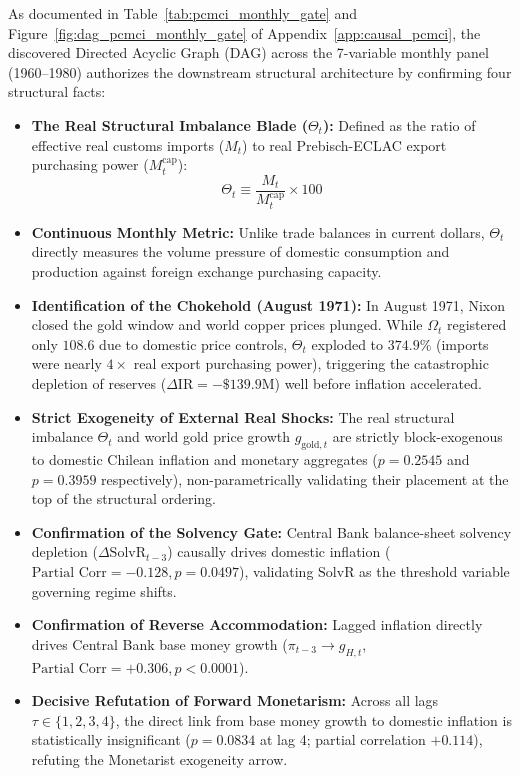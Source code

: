As documented in Table~\ref{tab:pcmci_monthly_gate} and Figure~\ref{fig:dag_pcmci_monthly_gate} of Appendix~\ref{app:causal_pcmci}, the discovered Directed Acyclic Graph (DAG) across the 7-variable monthly panel (1960--1980) authorizes the downstream structural architecture by confirming four structural facts:
\begin{itemize}[leftmargin=2em]
	\item \textbf{The Real Structural Imbalance Blade ($\Theta_t$):} Defined as the ratio of effective real customs imports ($M_t$) to real Prebisch-ECLAC export purchasing power ($M^{\text{cap}}_t$):
	\begin{equation}
		\Theta_t \equiv \frac{M_t}{M^{\text{cap}}_t} \times 100
	\end{equation}
	\item \textbf{Continuous Monthly Metric:} Unlike trade balances in current dollars, $\Theta_t$ directly measures the volume pressure of domestic consumption and production against foreign exchange purchasing capacity.
	\item \textbf{Identification of the Chokehold (August 1971):} In August 1971, Nixon closed the gold window and world copper prices plunged. While $\Omega_t$ registered only $108.6$ due to domestic price controls, $\Theta_t$ exploded to $374.9\%$ (imports were nearly $4\times$ real export purchasing power), triggering the catastrophic depletion of reserves ($\Delta \text{IR} = -\$139.9\text{M}$) well before inflation accelerated.
	\item \textbf{Strict Exogeneity of External Real Shocks:} The real structural imbalance $\Theta_t$ and world gold price growth $g_{\text{gold},t}$ are strictly block-exogenous to domestic Chilean inflation and monetary aggregates ($p = 0.2545$ and $p = 0.3959$ respectively), non-parametrically validating their placement at the top of the structural ordering.
	\item \textbf{Confirmation of the Solvency Gate:} Central Bank balance-sheet solvency depletion ($\Delta \text{SolvR}_{t-3}$) causally drives domestic inflation ($\text{Partial Corr} = -0.128, p = 0.0497$), validating $\text{SolvR}$ as the threshold variable governing regime shifts.
	\item \textbf{Confirmation of Reverse Accommodation:} Lagged inflation directly drives Central Bank base money growth ($\pi_{t-3} \to g_{H,t}$, $\text{Partial Corr} = +0.306, p < 0.0001$).
	\item \textbf{Decisive Refutation of Forward Monetarism:} Across all lags $\tau \in \{1, 2, 3, 4\}$, the direct link from base money growth to domestic inflation is statistically insignificant ($p = 0.0834$ at lag 4; partial correlation $+0.114$), refuting the Monetarist exogeneity arrow.
\end{itemize}


